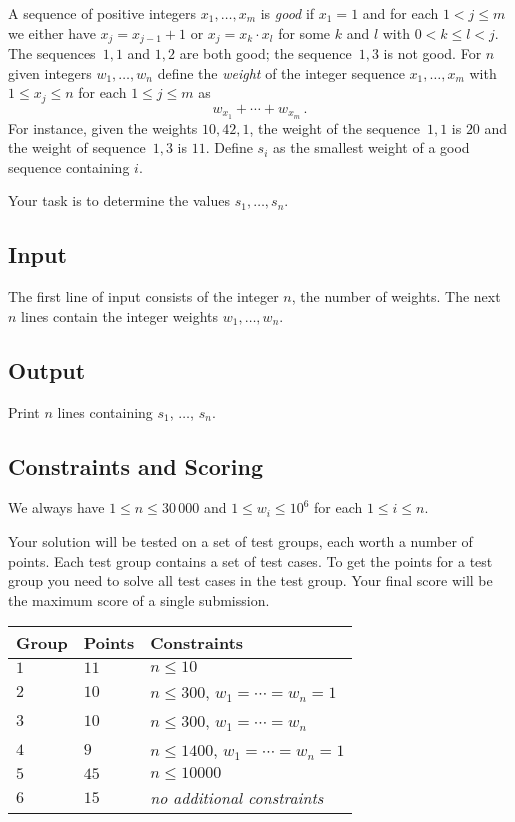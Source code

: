 
A sequence of positive integers $x_1,\ldots,x_m$ is \emph{good} if  $x_1 = 1$ and for each $1 < j \leq m$ we either have $x_j=x_{j-1}+1$ or $x_j=x_k\cdot x_l$ for some $k$ and $l$ with $0< k\leq l< j$.
The sequences~$1,1$ and $1,2$ are both good; the sequence~$1,3$ is not good.
For  $n$ given integers $w_1,\ldots,w_n$ define 
the \emph{weight} of the integer sequence $x_1,\ldots,x_m$ with $1\leq x_j \leq n$ for each $1\leq j\leq m$ as
\[ w_{x_1} +\cdots +w_{x_m}\,.\] 
For instance, given the weights $10, 42, 1$, the weight of the sequence~$1,1$ is $20$ and the weight of sequence~$1,3$ is $11$.
Define $s_i$ as the smallest weight of a good sequence containing $i$.

Your task is to determine the values $s_1,\ldots ,s_n$.

\subsection*{Input}

The first line of input consists of the integer $n$, the number of weights.
The next $n$ lines contain the integer weights $w_1, \ldots, w_n$.

\subsection*{Output}

Print $n$ lines containing $s_1$, $\ldots$, $s_n$.

\subsection*{Constraints and Scoring}

We always have
$1\leq n \leq 30\,000$ %
and
$1\leq w_i \leq 10^6$ for each $1\leq i \leq n$.%

Your solution will be tested on a set of test groups, each worth a number of points.
Each test group contains a set of test cases.
To get the points for a test group you need to solve all test cases in the test group.
Your final score will be the maximum score of a single submission.

\medskip
\begin{tabular}{lll}
Group & Points & Constraints \\\hline
$1$   & $11$ & $n\leq 10$ \\
$2$   & $10$ & $n\leq 300$, $w_1=\cdots=w_n = 1$ \\
$3$   & $10$ & $n\leq 300$, $w_1=\cdots=w_n$ \\ %
$4$   & $9$ & $n\leq 1400$, $w_1=\cdots=w_n = 1$ \\
$5$   & $45$ & $n\leq 10000$\\
$6$   & $15$ & \emph{no additional constraints}
\end{tabular}
